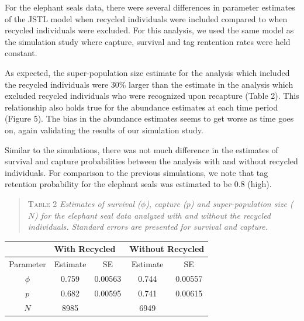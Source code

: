\documentclass[]{article}
\begin{document}
For the elephant seals data, there were several differences in parameter
estimates of the JSTL model when recycled individuals were included
compared to when recycled individuals were excluded. For this analysis, we used the same model as the simulation study where capture, survival and tag rentention rates were held constant.  

As expected, the
super-population size estimate for the analysis which included the
recycled individuals were 30\% larger than the estimate in the analysis
which excluded recycled individuals who were recognized upon recapture
(Table 2). This relationship also holds true for the abundance estimates
at each time period (Figure 5). The bias in the abundance estimates
seems to get worse as time goes on, again validating the results of our
simulation study.

Similar to the simulations, there was not much difference in the
estimates of survival and capture probabilities between the analysis
with and without recycled individuals. For comparison to the previous
simulations, we note that tag retention probability for the
elephant seals was estimated to be 0.8 (high).

\begin{quote}
\textsc{Table 2}
\textsl{Estimates of survival ($\phi$), capture ($p$) and super-population size ($N$) for the elephant seal data analyzed with and without the recycled individuals. Standard errors are presented for survival and capture.}
\end{quote}

\begin{center}
\begin{tabular}{c c c c c}
& \multicolumn{2}{l}{With Recycled} & \multicolumn{2}{l}{Without Recycled} \\ \hline
Parameter & Estimate & SE & Estimate & SE \\ \hline
$\phi$ & 0.759 & 0.00563 & 0.744 & 0.00557\\
$p$ & 0.682 & 0.00595 & 0.741 & 0.00615 \\
$N$ & 8985 & & 6949& \\ \hline
\end{tabular}
\end{center}
\end{document}
